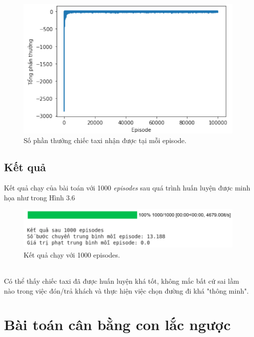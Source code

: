 \documentclass[12pt,a4paper]{report}
\begin{document}
\begin{figure}[h]
	\centering
	\includegraphics[scale=.6]{11}
	\caption{Số phần thưởng chiếc taxi nhận được tại mỗi episode.}
\end{figure}
\subsection{Kết quả}
Kết quả chạy của bài toán với 1000 \textit{episodes} sau quá trình huấn luyện được minh họa như
trong Hình 3.6
\begin{figure}[h]
	\centering
	\includegraphics[scale=.5]{12}
	\caption{Kết quả chạy với 1000 episodes.}
\end{figure}
\\Có thể thấy chiếc taxi đã được huấn luyện khá tốt, không mắc bất cứ sai lầm nào trong
việc đón/trả khách và thực hiện việc chọn đường đi khá "thông minh".
\section{Bài toán cân bằng con lắc ngược}
\end{document}
